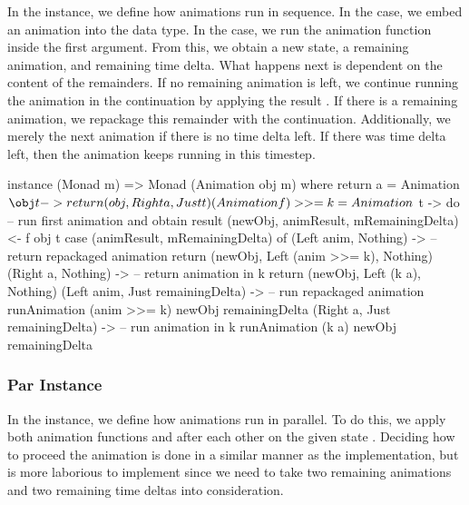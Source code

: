 In the  instance, we define how animations run in sequence. In the  case, we embed an animation into the  data type. In the \hs{>>=} case, we run the animation function inside the first argument. From this, we obtain a new state, a remaining animation, and remaining time delta. What happens next is dependent on the content of the remainders. If no remaining animation is left, we continue running the animation in the continuation  by applying the result . If there is a remaining animation, we repackage this remainder with the continuation. Additionally, we merely  the next animation if there is no time delta left. If there was time delta left, then the animation keeps running in this timestep.

\begin{code}
instance (Monad m) => Monad (Animation obj m) where
  return a = Animation $ \obj t -> return (obj, Right a, Just t)
  (Animation f) >>= k = Animation $ \obj t -> do
    -- run first animation and obtain result
    (newObj, animResult, mRemainingDelta) <- f obj t
    case (animResult, mRemainingDelta) of
      (Left anim, Nothing) -> -- return repackaged animation
        return (newObj, Left (anim >>= k), Nothing)
      (Right a, Nothing) -> -- return animation in k
        return (newObj, Left (k a), Nothing)
      (Left anim, Just remainingDelta) -> -- run repackaged animation
        runAnimation (anim >>= k) newObj remainingDelta
      (Right a, Just remainingDelta) -> -- run animation in k
        runAnimation (k a) newObj remainingDelta
\end{code}

\subsubsection{Par Instance}

In the  instance, we define how animations run in parallel. To do this, we apply both animation functions  and  after each other on the given state . Deciding how to proceed the animation is done in a similar manner as the  implementation, but is more laborious to implement since we need to take two remaining animations and two remaining time deltas into consideration.


